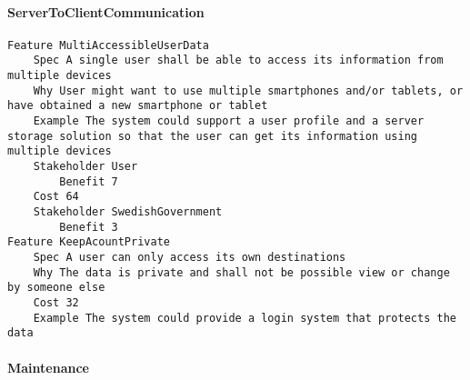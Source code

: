 				
			 \paragraph{ServerToClientCommunication}


\begin{lstlisting}
Feature MultiAccessibleUserData
	Spec A single user shall be able to access its information from multiple devices
	Why User might want to use multiple smartphones and/or tablets, or have obtained a new smartphone or tablet
	Example The system could support a user profile and a server storage solution so that the user can get its information using multiple devices
	Stakeholder User
		Benefit 7
	Cost 64
	Stakeholder SwedishGovernment
		Benefit 3
Feature KeepAcountPrivate
	Spec A user can only access its own destinations
	Why The data is private and shall not be possible view or change by someone else
	Cost 32
	Example The system could provide a login system that protects the data

\end{lstlisting}
		
				
			 \paragraph{Maintenance}


